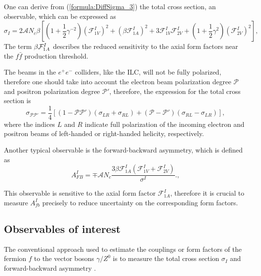 One can derive from (\ref{formula:DiffSigma_3}) the total cross section, an observable, which can be expressed as
\begin{equation}
\sigma_I = 2\mathcal{A}N_c\beta[(1+\frac{1}{2}\gamma^{-2})(\mathcal{F}^I_{1V})^2 + (\beta\mathcal{F}^I_{1A})^2+3\mathcal{F}^I_{1V}\mathcal{F}^I_{2V}+(1+\frac{1}{2}\gamma^{2})(\mathcal{F}^I_{2V})^2],
\end{equation}
The term $\beta \mathcal{F}^I_{1A}$ describes the reduced sensitivity to the axial form factors near the $f\bar{f}$ production threshold. 

The beams in the $e^+e^-$ colliders, like the ILC, will not be fully polarized, therefore one should take into account the electron beam polarization degree $\mathcal{P}$ and positron polarization degree $\mathcal{P}'$, therefore, the expression for the total cross section is
\begin{equation}
\sigma_{\mathcal{P}\mathcal{P}'} = \frac{1}{4}[(1-\mathcal{P}\mathcal{P}')(\sigma_{LR}+\sigma_{RL} ) + (\mathcal{P} - \mathcal{P}')(\sigma_{RL} - \sigma_{LR})],
\end{equation}
where the indices $L$ and $R$ indicate full polarization of the incoming electron and positron beams of left-handed or right-handed helicity, respectively.

Another typical observable is the forward-backward asymmetry, which is defined as
\begin{equation}
A_{FB}^I = \mp \mathcal{A} N_c \frac{3\beta\mathcal{F}^I_{1A}(\mathcal{F}^I_{1V} + \mathcal{F}^I_{2V})}{\sigma^I}.
\label{formula:AfbForm_3},
\end{equation}

This observable is sensitive to the axial form factor $\mathcal{F}^I_{1A}$, therefore it is crucial to measure $A_{fb}^I$ precisely to reduce uncertainty on the corresponding form factors.
\subsection{Observables of interest}
The conventional approach used to estimate the couplings or form factors of the fermion $f$ to the vector bosons $\gamma /Z^0$ is to measure the total cross section $\sigma_I$ and forward-backward asymmetry \afb.

